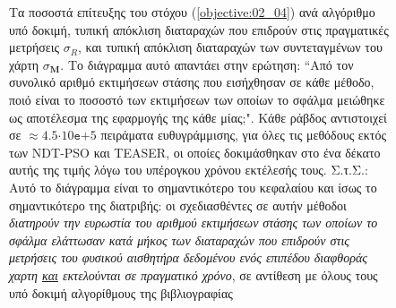 \begin{figure}\vspace{1.5cm}\hspace{0.6cm}%
  
  \vspace{0.75cm}
  \caption{\small Τα ποσοστά επίτευξης του στόχου (\ref{objective:02_04}) ανά
           αλγόριθμο υπό δοκιμή, τυπική απόκλιση διαταραχών που επιδρούν στις
           πραγματικές μετρήσεις $\sigma_R$, και τυπική απόκλιση διαταραχών των
           συντεταγμένων του χάρτη $\sigma_{\bm{M}}$. Το διάγραμμα αυτό
           απαντάει στην ερώτηση: ``Από τον συνολικό αριθμό εκτιμήσεων στάσης
           που εισήχθησαν σε κάθε μέθοδο, ποιό είναι το ποσοστό των εκτιμήσεων
           των οποίων το σφάλμα μειώθηκε ως αποτέλεσμα της εφαρμογής της κάθε
           μίας;". Κάθε ράβδος αντιστοιχεί σε $\approx
           4.5$$\cdot$$10\texttt{e}$$+$$5$ πειράματα ευθυγράμμισης, για όλες
           τις μεθόδους εκτός των NDT-PSO και TEASER, οι οποίες δοκιμάσθηκαν
           στο ένα δέκατο αυτής της τιμής λόγω του υπέρογκου χρόνου εκτέλεσής
           τους.  Σ.τ.Σ.: Αυτό το διάγραμμα είναι το σημαντικότερο του
           κεφαλαίου και ίσως το σημαντικότερο της διατριβής: οι σχεδιασθέντες
           σε αυτήν μέθοδοι \textit{διατηρούν την ευρωστία του αριθμού
           εκτιμήσεων στάσης των οποίων το σφάλμα ελάττωσαν κατά μήκος των
           διαταραχών που επιδρούν στις μετρήσεις του φυσικού αισθητήρα
           δεδομένου ενός επιπέδου διαφθοράς χαρτη \underline{και} εκτελούνται
           σε πραγματικό χρόνο}, σε αντίθεση με όλους τους υπό δοκιμή
           αλγορίθμους της βιβλιογραφίας}
  \label{fig:02_04_05:01}
\end{figure}

